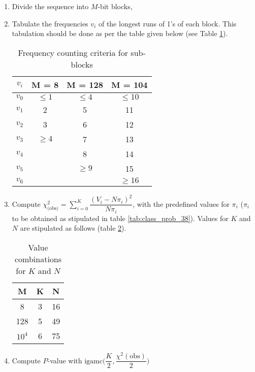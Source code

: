 \begin{enumerate}
    \item Divide the sequence into $M$-bit blocks,
    \item Tabulate the frequencies $v_i$ of the longest runs of 1's of each block. This tabulation should be done as per the table given below (see Table \ref{tab:sb_freq_crit}).
    
    \begin{table}[h!]
        \centering
        \begin{tabular}{|c|c|c|c|} \hline
            \textbf{$v_i$} & \textbf{M = 8} & \textbf{M = 128} & \textbf{M = 104} \\ \hline
            \textbf{$v_0$} & $\leq 1$ & $\leq 4$ & $\leq 10$ \\ \hline
            \textbf{$v_1$} & 2 & 5 & 11 \\ \hline
            \textbf{$v_2$} & 3 & 6 & 12 \\ \hline
            \textbf{$v_3$} & $\geq 4$ & 7 & 13 \\ \hline
            \textbf{$v_4$} &  & 8 & 14 \\ \hline
            \textbf{$v_5$} &  & $\geq 9$ & 15 \\ \hline
            \textbf{$v_6$} &  &  & $\geq 16$ \\ \hline
        \end{tabular}
        \caption{Frequency counting criteria for sub-blocks}
        \label{tab:sb_freq_crit}
    \end{table}
    
    \item Compute $\chi^2_{\text{(obs)}} = \sum_{i=0}^{K} \dfrac{(V_i - N\pi_i)^2}{N\pi_i}$, with the predefined values for $\pi_i$ ($\pi_i$ to be obtained as stipulated in table \ref{tab:class_prob_38}). Values for $K$ and $N$ are stipulated as follows (table \ref{tab:kn_values}).
    
    \begin{table}[h!]
    \centering
        \begin{tabular}{|c|c|c|} \hline
        \textbf{M} & \textbf{K} & \textbf{N} \\ \hline
        8 & 3 & 16 \\ \hline
        128 & 5 & 49 \\ \hline
        $10^4$ & 6 & 75 \\ \hline
        \end{tabular}
        \caption{Value combinations for $K$ and $N$}
        \label{tab:kn_values}
    \end{table}
    
    \item Compute $P$-value with $\text{igamc}\bigg(\dfrac{K}{2}, \dfrac{\chi^2(\text{obs})}{2}\bigg)$
\end{enumerate}

